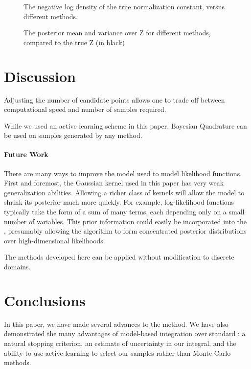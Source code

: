 \documentclass{article}
\begin{document}
\begin{figure}
	\centering
	\caption{The negative log density of the true normalization constant, versus different methods.}
\end{figure}

\begin{figure}
	\centering
	\caption{The posterior mean and variance over Z for different methods, compared to the true Z (in black)}
\end{figure}




\section{Discussion}

Adjusting the number of candidate points allows one to trade off between computational speed and number of samples required.

While we used an active learning scheme in this paper, Bayesian Quadrature can be used on samples generated by any method.

\paragraph{Future Work}There are many ways to improve the \gpb model used to model likelihood functions.  First and foremost, the Gaussian kernel used in this paper has very weak generalization abilities.  Allowing a richer class of kernels will allow the \gpb model to shrink its posterior much more quickly.  For example, log-likelihood functions typically take the form of a sum of many terms, each depending only on a small number of variables.  This prior information could easily be incorporated into the \gp, presumably allowing the  algorithm to form concentrated posterior distributions over high-dimensional likelihoods.

The methods developed here can be applied without modification to discrete domains.

\section{Conclusions}

 In this paper, we have made several advances to the  method.  We have also demonstrated the many advantages of model-based integration over standard : a natural stopping criterion, an estimate of uncertainty in our integral, and the ability to use active learning to select our samples rather than Monte Carlo methods.
\end{document}
